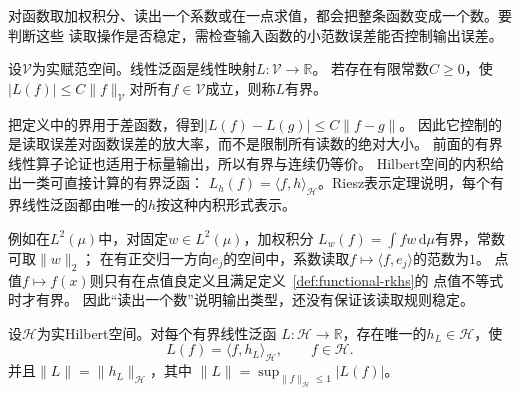 对函数取加权积分、读出一个系数或在一点求值，都会把整条函数变成一个数。要判断这些
读取操作是否稳定，需检查输入函数的小范数误差能否控制输出误差。
\begin{definition}[有界线性泛函]
\label{def:functional-bounded-linear-functional}
设$\mathcal V$为实赋范空间。线性泛函是线性映射$L:\mathcal V\to\mathbb R$。
若存在有限常数$C\geq0$，使
$|L(f)|\leq C\lVert f\rVert_{\mathcal V}$对所有$f\in\mathcal V$成立，则称$L$有界。
\end{definition}
把定义中的界用于差函数，得到$|L(f)-L(g)|\leq C\lVert f-g\rVert$。
因此它控制的是读取误差对函数误差的放大率，而不是限制所有读数的绝对大小。
前面的有界线性算子论证也适用于标量输出，所以有界与连续仍等价。
Hilbert空间的内积给出一类可直接计算的有界泛函：
$L_h(f)=\langle f,h\rangle_{\mathcal{H}}$。Riesz表示定理说明，每个有界线性泛函都由唯一的$h$按这种内积形式表示。

例如在$L^2(\mu)$中，对固定$w\in L^2(\mu)$，加权积分
$L_w(f)=\int fw\,\mathrm d\mu$有界，常数可取$\lVert w\rVert_2$；
在有正交归一方向$e_j$的空间中，系数读取$f\mapsto\langle f,e_j\rangle$的范数为$1$。
点值$f\mapsto f(x)$则只有在点值良定义且满足定义~\ref{def:functional-rkhs}的
点值不等式时才有界。
因此“读出一个数”说明输出类型，还没有保证该读取规则稳定。

\begin{theorem}[Riesz表示定理]
\label{thm:functional-riesz-representation}
设$\mathcal{H}$为实Hilbert空间。对每个有界线性泛函
$L:\mathcal{H}\to\mathbb{R}$，存在唯一的$h_L\in\mathcal{H}$，使
\begin{equation}
  L(f)=\langle f,h_L\rangle_{\mathcal{H}},
  \qquad f\in\mathcal{H}.
  \label{eq:functional-riesz-representation}
\end{equation}
并且$\lVert L\rVert=\lVert h_L\rVert_{\mathcal{H}}$，其中
$\lVert L\rVert=\sup_{\lVert f\rVert_{\mathcal{H}}\leq1}|L(f)|$。
\end{theorem}


